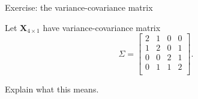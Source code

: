 \documentclass[ignorenonframetext,]{beamer}
\begin{document}
\begin{frame}

\begin{block}{Exercise: the variance-covariance matrix}

Let \(\mathbf{X}_{4\times 1}\) have variance-covariance matrix
\[\Sigma= \left[ \begin{array}{cccc} 2&1&0&0\\
      1&2&0&1\\
      0&0&2&1\\
      0&1&1&2\\
          \end{array}
          \right].\]

Explain what this means.

\end{block}

\end{frame}
\end{document}
